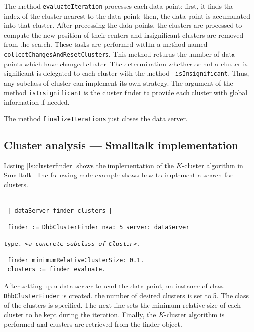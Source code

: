 \documentclass[twoside]{book}
\begin{document}
\noindent The method {\tt evaluateIteration} processes each data
point: first, it finds the index of the cluster nearest to the
data point; then, the data point is accumulated into that cluster.
After processing the data points, the clusters are processed to
compute the new position of their centers and insignificant
clusters are removed from the search. These tasks are performed
within a method named {\tt collectChangesAndResetClusters}. This
method returns the number of data points which have changed
cluster. The determination whether or not a cluster is significant
is delegated to each cluster with the method {\tt
isInsignificant}. Thus, any subclass of cluster can implement its
own strategy. The argument of the method {\tt isInsignificant} is
the cluster finder to provide each cluster with global information
if needed.

\noindent The method {\tt finalizeIterations} just closes the data
server.

\subsection{Cluster analysis --- Smalltalk implementation}
Listing \ref{ls:clusterfinder} shows the implementation of the
$K$-cluster algorithm in Smalltalk. The following code example
shows how to implement a search for clusters.
\begin{codeExample}
\begin{verbatim}

 | dataServer finder clusters |
\end{verbatim}
\begin{verbatim}
 finder := DhbClusterFinder new: 5 server: dataServer
\end{verbatim}
\hfil{\tt type: <\sl a concrete subclass of \tt Cluster>.}
\begin{verbatim}
 finder minimumRelativeClusterSize: 0.1.
 clusters := finder evaluate.
\end{verbatim}
\end{codeExample}
After setting up a data server to read the data point, an instance
of class {\tt DhbClusterFinder} is created. the number of desired
clusters is set to 5. The class of the clusters is specified. The
next line sets the minimum relative size of each cluster to be
kept during the iteration. Finally, the $K$-cluster algorithm is
performed and clusters are retrieved from the finder object.
\end{document}
